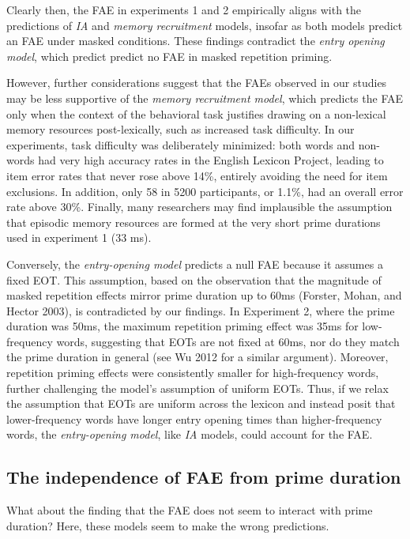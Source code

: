 \documentclass[
]{interact}
\begin{document}
Clearly then, the FAE in experiments 1 and 2 empirically aligns with the
predictions of \emph{IA} and \emph{memory recruitment} models, insofar
as both models predict an FAE under masked conditions. These findings
contradict the \emph{entry opening model}, which predict predict no FAE
in masked repetition priming.

However, further considerations suggest that the FAEs observed in our
studies may be less supportive of the \emph{memory recruitment model},
which predicts the FAE only when the context of the behavioral task
justifies drawing on a non-lexical memory resources post-lexically, such
as increased task difficulty. In our experiments, task difficulty was
deliberately minimized: both words and non-words had very high accuracy
rates in the English Lexicon Project, leading to item error rates that
never rose above 14\%, entirely avoiding the need for item exclusions.
In addition, only 58 in 5200 participants, or 1.1\%, had an overall
error rate above 30\%. Finally, many researchers may find implausible
the assumption that episodic memory resources are formed at the very
short prime durations used in experiment 1 (33 ms).

Conversely, the \emph{entry-opening model} predicts a null FAE because
it assumes a fixed EOT. This assumption, based on the observation that
the magnitude of masked repetition effects mirror prime duration up to
60ms (Forster, Mohan, and Hector 2003), is contradicted by our findings.
In Experiment 2, where the prime duration was 50ms, the maximum
repetition priming effect was 35ms for low-frequency words, suggesting
that EOTs are not fixed at 60ms, nor do they match the prime duration in
general (see Wu 2012 for a similar argument). Moreover, repetition
priming effects were consistently smaller for high-frequency words,
further challenging the model's assumption of uniform EOTs. Thus, if we
relax the assumption that EOTs are uniform across the lexicon and
instead posit that lower-frequency words have longer entry opening times
than higher-frequency words, the \emph{entry-opening model}, like
\emph{IA} models, could account for the FAE.

\subsection{The independence of FAE from prime
duration}\label{the-independence-of-fae-from-prime-duration}

What about the finding that the FAE does not seem to interact with prime
duration? Here, these models seem to make the wrong predictions.
\end{document}
